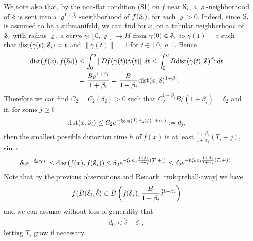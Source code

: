 \documentclass[reqno,12pt,a4paper]{amsart}
\theoremstyle{plain}
\theoremstyle{definition}
\begin{document}
We note also that, by the non-flat condition (S1) on $f$
near ${\EuScript{S}}_i$, a ${\varrho}$-neighborhood of ${\EuScript{S}}$ is sent into a
${\varrho}^{1+\beta_i}$-neighborhood of $f({\EuScript{S}}_i)$, for each
${\varrho}>0$. Indeed, since ${\EuScript{S}}_i$ is assumed to be a
submanifold, we can find for $x$, on a tubular neighborhood
of ${\EuScript{S}}_i$ with radius ${\varrho}$, a curve $\gamma:[0,{\varrho}]\to
M$ from $\gamma(0)\in{\EuScript{S}}_i$ to $\gamma(1)=x$ such that
${\operatorname{dist}}(\gamma(t),{\EuScript{S}}_i)=t$ and $\|\dot\gamma(t)\|=1$ for
$t\in[0,{\varrho}]$. Hence
  \begin{align}
    {\operatorname{dist}}(f(x),f({\EuScript{S}}_i))
    &\le\nonumber
    \int_0^{\varrho}
    \|Df(\gamma(t))\dot\gamma(t)\|\,dt
    \le
    \int_0^{\varrho} B {\operatorname{dist}}(\gamma(t),{\EuScript{S}})^{\beta_i}\,dt
    \\
    &=
    \frac{B{\varrho}^{1+\beta_i}}{1+\beta_i}
    =\frac{B}{1+\beta_i}{\operatorname{dist}}(x,{\EuScript{S}})^{1+\beta_i}.
    \label{eq:distS1}
  \end{align}
  Therefore we can find $C_2=C_2(\delta_2)>0$ such that
  $C_2^{1+\beta_i} B/(1+\beta_i)=\delta_2$ and if, for some
  $j\ge0$
  \begin{align}\label{eq:dist-time}
    {\operatorname{dist}}(x,{\EuScript{S}}_i)\le C_2 e^{-\xi_0 c_0
      (T_i+j)/(1+\alpha_i)}:=d_j,
  \end{align}
  then the smallest possible distortion time $h$ of $f(x)$
  is at least $\frac{1+\beta_i}{1+\alpha_i}(T_i+j)$, since
  \begin{align*}
    \delta_2 e^{-\xi_0 c_0 h}
    \le
    {\operatorname{dist}}(f(x),f({\EuScript{S}}_i))
    \le
    \delta_2 e^{- \xi_0 c_0
      \frac{1+\beta_i}{1+\alpha_i}(T_i+j)}
    \le
    \delta_2 e^{-b \xi_0 c_0
      \frac{1+\beta_i}{1+\alpha_i}(T_i+j)}.
  \end{align*}
  Note that by the previous observations and
  Remark~\ref{rmk:preball-away} we have
  \begin{align*}
    f(B({\EuScript{S}}_i,\tilde\delta)\subset
    B\left(f({\EuScript{S}}_i),\frac{B}{1+\beta_i}
      \tilde\delta^{1+\beta_i}
    \right)
  \end{align*}
  and we can assume without loss of generality that
  \begin{align}\label{eq:d_0}
    d_0<\tilde\delta-\delta_1,
  \end{align}
  letting $T_i$ grow if necessary.
\end{document}
